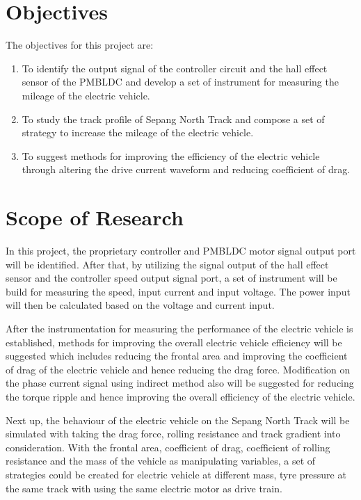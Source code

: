 \section{Objectives}

The objectives for this project are:

\begin{enumerate}
	\item To identify the output signal of the controller circuit and the hall effect sensor of the PMBLDC and develop a set of instrument for measuring the mileage of the electric vehicle.
	\item To study the track profile of Sepang North Track and compose a set of strategy to increase the mileage of the electric vehicle.
	\item To suggest methods for improving the efficiency of the electric vehicle through altering the drive current waveform and reducing coefficient of drag.
\end{enumerate}

\section{Scope of Research}

In this project, the proprietary controller and PMBLDC motor signal output port will be identified. After that, by utilizing the signal output of the hall effect sensor and the controller speed output signal port, a set of instrument will be build for measuring the speed, input current and input voltage. The power input will then be calculated based on the voltage and current input.

After the instrumentation for measuring the performance of the electric vehicle is established, methods for improving the overall electric vehicle efficiency will be suggested which includes reducing the frontal area and improving the coefficient of drag of the electric vehicle and hence reducing the drag force. Modification on the phase current signal using indirect method also will be suggested for reducing the torque ripple and hence improving the overall efficiency of the electric vehicle.

Next up, the behaviour of the electric vehicle on the Sepang North Track will be simulated with taking the drag force, rolling resistance and track gradient into consideration. With the frontal area, coefficient of drag, coefficient of rolling resistance and the mass of the vehicle as manipulating variables, a set of strategies could be created for electric vehicle at different mass, tyre pressure at the same track with using the same electric motor as drive train.

